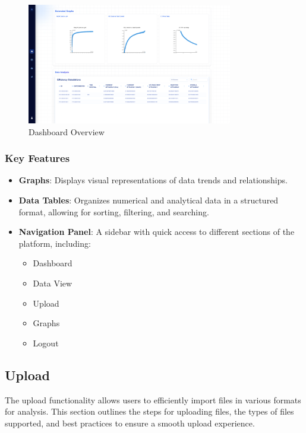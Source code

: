 \documentclass[12pt]{article}
\begin{document}
\begin{figure}[H]
    \centering
    \includegraphics[width=0.8\textwidth]{./Diagrams/Dashboard.png}
    \caption{Dashboard Overview}
\end{figure}


\subsubsection{Key Features}
\begin{itemize}
    \item \textbf{Graphs}: Displays visual representations of data trends and
    relationships.
    \item \textbf{Data Tables}: Organizes numerical and analytical data in a
    structured format, allowing for sorting, filtering, and searching.
    \item \textbf{Navigation Panel}: A sidebar with quick access to different
    sections of the platform, including:
    \begin{itemize}
        \item Dashboard
        \item Data View
        \item Upload
        \item Graphs
        \item Logout
    \end{itemize}
\end{itemize}

\subsection{Upload}

The upload functionality allows users to efficiently import files in various
formats for analysis. This section outlines the steps for uploading files, the
types of files supported, and best practices to ensure a smooth upload
experience.
\end{document}
